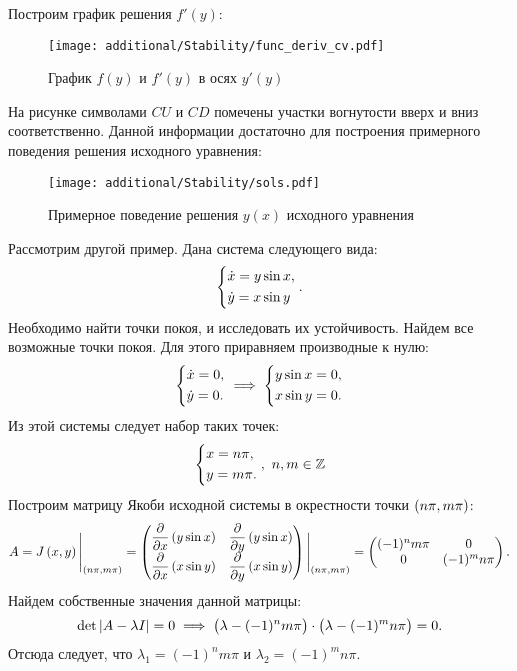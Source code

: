 		\pagebreak
		
		Построим график решения $f'(y)$:
		\begin{figure}[H]
			\centering
			\texttt{[image: additional/Stability/func\_deriv\_cv.pdf]}
			\caption{График $f(y)$ и $f'(y)$ в осях $y'(y)$}
		\end{figure}
		На рисунке символами $CU$ и $CD$ помечены участки вогнутости вверх и вниз соответственно. Данной информации достаточно для построения примерного поведения решения исходного уравнения:
		\begin{figure}[H]
			\centering
			\texttt{[image: additional/Stability/sols.pdf]}
			\caption{Примерное поведение решения $y(x)$ исходного уравнения}
		\end{figure}

		\pagebreak

		Рассмотрим другой пример. Дана система следующего вида:
		\[ \left\lbrace \begin{aligned} &\dot{x} = y\sin{x}, \\ &\dot{y} = x\sin{y} \end{aligned} \right.. \]
		Необходимо найти точки покоя, и исследовать их устойчивость. Найдем все возможные точки покоя. Для этого приравняем производные к нулю:
		\[ \left\lbrace \begin{aligned} &\dot{x} = 0, \\ &\dot{y} = 0. \end{aligned} \right. \implies \left\lbrace \begin{aligned} &y \sin{x} = 0, \\ &x \sin{y} = 0. \end{aligned} \right. \]
		Из этой системы следует набор таких точек:
		\[ \left\lbrace \begin{aligned} &x = n\pi, \\ &y = m\pi. \end{aligned} \right., ~ n, m \in \mathbb{Z} \]
		Построим матрицу Якоби исходной системы в окрестности точки $\left( n\pi, m\pi \right)$:
		\[ A = J\left( x, y \right) \Biggl\vert \Biggr._{\left( n \pi, m \pi \right)} = \begin{pmatrix} 
			\dfrac{\partial }{\partial x}\left( y \sin{x} \right) & \dfrac{\partial }{\partial y}\left( y \sin{x} \right) \\
			\dfrac{\partial }{\partial x}\left( x \sin{y} \right) & \dfrac{\partial }{\partial y}\left( x \sin{y} \right)
		\end{pmatrix} \Biggl\vert \Biggr._{\left( n \pi, m \pi \right)} = \begin{pmatrix}
			(-1)^n m \pi & 0 \\
			0 & (-1)^m n \pi
		\end{pmatrix}. \]
		Найдем собственные значения данной матрицы:
		\[ \det{ \left\vert A - \lambda I \right\vert } = 0 \implies \bigl( \lambda - (-1)^n m \pi \bigr) \cdot \bigl( \lambda - (-1)^m n \pi \bigr) = 0. \]
		Отсюда следует, что $\lambda_1 = (-1)^n m \pi$ и $\lambda_2 = (-1)^m n \pi$. 


